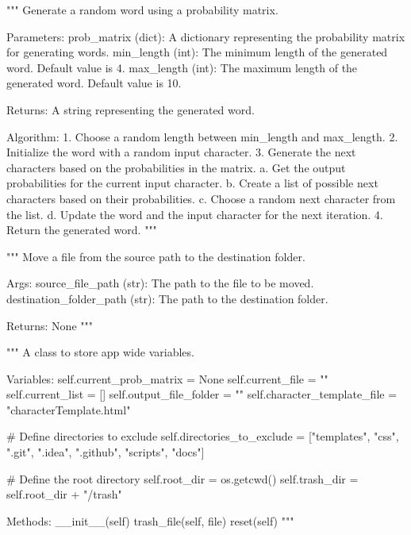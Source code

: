 \begin{codebox}[generate\_word(prob\_matrix, min\_length=4, max\_length=10)]
"""
Generate a random word using a probability matrix.

Parameters:
    prob_matrix (dict): A dictionary representing the probability matrix for generating words.
    min_length (int): The minimum length of the generated word. Default value is 4.
    max_length (int): The maximum length of the generated word. Default value is 10.

Returns:
    A string representing the generated word.

Algorithm:
    1. Choose a random length between min_length and max_length.
    2. Initialize the word with a random input character.
    3. Generate the next characters based on the probabilities in the matrix.
        a. Get the output probabilities for the current input character.
        b. Create a list of possible next characters based on their probabilities.
        c. Choose a random next character from the list.
        d. Update the word and the input character for the next iteration.
    4. Return the generated word.
"""
\end{codebox}

\begin{codebox}
"""
Move a file from the source path to the destination folder.

Args:
    source_file_path (str): The path to the file to be moved.
    destination_folder_path (str): The path to the destination folder.

Returns:
    None
"""
\end{codebox}

\begin{classbox}
"""
A class to store app wide variables.

Variables:
	self.current_prob_matrix = None
	self.current_file = ""
	self.current_list = []
	self.output_file_folder = ""
	self.character_template_file = "characterTemplate.html"
	
	# Define directories to exclude
	self.directories_to_exclude = ["templates", "css", ".git", ".idea", ".github", "scripts", "docs"]
	
	# Define the root directory
	self.root_dir = os.getcwd()
	self.trash_dir = self.root_dir + "/trash"
	
Methods:
	__init__(self)
	trash_file(self, file)
	reset(self)
"""
\end{classbox}

